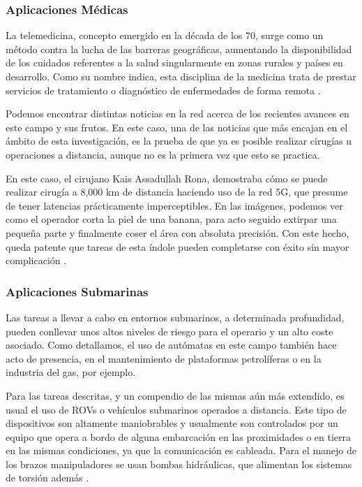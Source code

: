 \subsubsection{Aplicaciones Médicas}
La telemedicina, concepto emergido en la década de los 70, surge como un método contra la lucha de las barreras geográficas, aumentando la disponibilidad de los cuidados referentes a la salud singularmente en zonas rurales y países en desarrollo. Como su nombre indica, esta disciplina de la medicina trata de prestar servicios de tratamiento o diagnóstico de enfermedades de forma remota \cite{12}. 

Podemos encontrar distintas noticias en la red acerca de los recientes avances en este campo y sus frutos. En este caso, una de las noticias que más encajan en el ámbito de esta investigación, es la prueba de que ya es posible realizar cirugías u operaciones a distancia, aunque no es la primera vez que esto se practica. 

En este caso, el cirujano Kais Assadullah Rona, demostraba cómo se puede realizar cirugía a 8,000 km de distancia haciendo uso de la red 5G, que presume de tener latencias prácticamente imperceptibles. En las imágenes, podemos ver como el operador corta la piel de una banana, para acto seguido extirpar una pequeña parte y finalmente coser el área con absoluta precisión. Con este hecho, queda patente que tareas de esta índole pueden completarse con éxito sin mayor complicación \cite{13}.
   
\subsubsection{Aplicaciones Submarinas}
Las tareas a llevar a cabo en entornos submarinos, a determinada profundidad, pueden conllevar unos altos niveles  de riesgo para el operario y un alto coste asociado. Como detallamos, el uso de autómatas en este campo también hace acto de presencia, en el mantenimiento de plataformas petrolíferas o en la industria del gas, por ejemplo. 

Para las tareas descritas, y un compendio de las mismas aún más extendido, es usual el uso de ROVs o vehículos submarinos operados a distancia. Este tipo de dispositivos son altamente maniobrables y usualmente son controlados por un equipo que opera a bordo de alguna embarcación en las proximidades o en tierra en las mismas condiciones, ya que la comunicación es cableada. Para el manejo de los brazos manipuladores se usan bombas hidráulicas, que alimentan los sistemas de torsión además \cite{14}.

